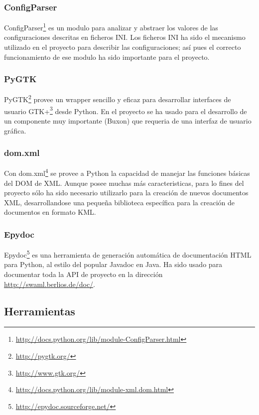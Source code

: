 \subsubsection{ConfigParser}

ConfigParser\footnote{\url{http://docs.python.org/lib/module-ConfigParser.html}}
es un modulo para analizar y abstraer los valores de las configuraciones descritas
en ficheros INI. Los ficheros INI ha sido el mecanismo utilizado en el proyecto
para describir las configuraciones; así pues el correcto funcionamiento de ese 
modulo ha sido importante para el proyecto.

\subsubsection{PyGTK}

PyGTK\footnote{\url{http://pygtk.org/}} provee un wrapper sencillo y eficaz 
para desarrollar interfaces de usuario GTK+\footnote{\url{http://www.gtk.org/}} 
desde Python. En el proyecto se ha usado para el desarrollo de un componente 
muy importante (Buxon) que requeria de una interfaz de usuario gráfica.

\subsubsection{dom.xml}

Con dom.xml\footnote{\url{http://docs.python.org/lib/module-xml.dom.html}} se
provee a Python la capacidad de manejar las funciones básicas del DOM de XML.
Aunque posee muchas más caracteristicas, para lo fines del proyecto sólo
ha sido necesario utilizarlo para la creación de nuevos documentos XML,
desarrollandose una pequeña biblioteca específica para la creación de 
documentos en formato KML.

\subsubsection{Epydoc}

Epydoc\footnote{\url{http://epydoc.sourceforge.net/}} es una herramienta de
generación automática de documentación HTML para Python, al estilo del popular
Javadoc en Java. Ha sido usado para documentar toda la API de proyecto en
la dirección \url{http://swaml.berlios.de/doc/}.

\subsection{Herramientas}

